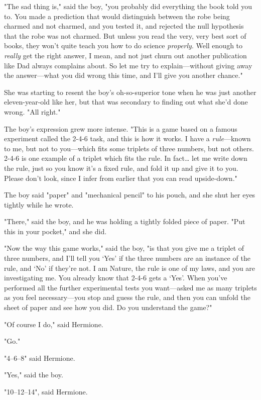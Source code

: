 "The sad thing is," said the boy, "you probably did everything the book told
you to. You made a prediction that would distinguish between the robe being
charmed and not charmed, and you tested it, and rejected the null hypothesis
that the robe was not charmed. But unless you read the very, very best sort of
books, they won't quite teach you how to do science \emph{properly}. Well
enough to \emph{really} get the right answer, I mean, and not just churn out
another publication like Dad always complains about. So let me try to
explain---without giving away the answer---what you did wrong this time, and
I'll give you another chance."

She was starting to resent the boy's oh-so-superior tone when he was just
another eleven-year-old like her, but that was secondary to finding out what
she'd done wrong. "All right."

The boy's expression grew more intense. "This is a game based on a famous
experiment called the 2-4-6 task, and this is how it works. I have a
\emph{rule}---known to me, but not to you---which fits some triplets of three
numbers, but not others. 2-4-6 is one example of a triplet which fits the rule.
In fact{\ldots} let me write down the rule, just so you know it's a fixed rule,
and fold it up and give it to you. Please don't look, since I infer from
earlier that you can read upside-down."

The boy said "paper" and "mechanical pencil" to his pouch, and she shut her
eyes tightly while he wrote.

"There," said the boy, and he was holding a tightly folded piece of paper. "Put
this in your pocket," and she did.

"Now the way this game works," said the boy, "is that you give me a triplet of
three numbers, and I'll tell you `Yes' if the three numbers are an instance of
the rule, and `No' if they're not. I am Nature, the rule is one of my laws, and
you are investigating me. You already know that 2-4-6 gets a `Yes'. When you've
performed all the further experimental tests you want---asked me as many
triplets as you feel necessary---you stop and guess the rule, and then you can
unfold the sheet of paper and see how you did. Do you understand the game?"

"Of course I do," said Hermione.

"Go."

"4--6--8" said Hermione.

"Yes," said the boy.

"10--12--14", said Hermione.

